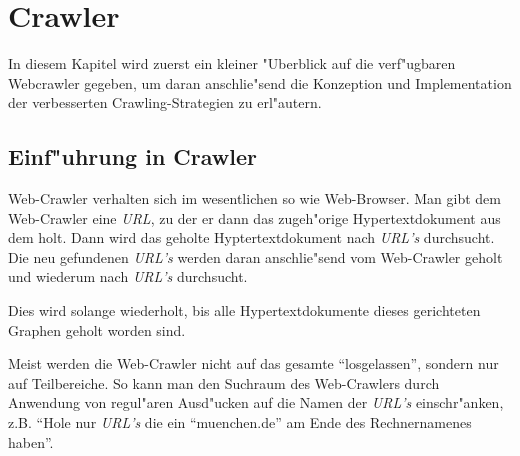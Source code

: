 \chapter{Crawler}
\label{Crawler}

In diesem Kapitel wird zuerst ein kleiner "Uberblick auf die verf"ugbaren Webcrawler gegeben, um daran anschlie"send die Konzeption und Implementation der verbesserten Crawling-Strategien zu erl"autern.

\section{Einf"uhrung in Crawler}
Web-Crawler verhalten sich im wesentlichen so wie Web-Browser. Man gibt dem Web-Crawler eine {\em URL}, zu der er dann das zugeh"orige Hypertextdokument aus dem \www holt. Dann wird das geholte Hyptertextdokument nach {\em URL's} durchsucht. Die neu gefundenen {\em URL's} werden daran anschlie"send vom Web-Crawler geholt und wiederum nach {\em URL's} durchsucht.

Dies wird solange wiederholt, bis alle Hypertextdokumente dieses gerichteten Graphen geholt worden sind.

Meist werden die Web-Crawler nicht auf das gesamte \www "`losgelassen"', sondern nur auf Teilbereiche. So kann man den Suchraum des Web-Crawlers durch Anwendung von regul"aren Ausd"ucken auf die Namen der {\em URL's} einschr"anken, z.B. "`Hole nur  {\em URL's} die ein "`muenchen.de"' am Ende des Rechnernamenes haben"'.

